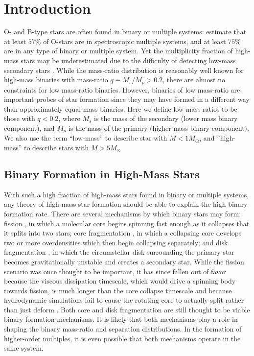 \section{Introduction}
O- and B-type stars are often found in binary or
multiple systems: \cite{Mason2009} estimate that at least $57\%$ of O-stars are
in spectroscopic multiple systems, and at least $75\%$ are in any type of binary or multiple system.
Yet the multiplicity fraction of high-mass stars may be underestimated due to the difficulty of detecting low-mass secondary stars \citep{Sana2011}.  While the mass-ratio distribution
is reasonably well known for high-mass binaries with mass-ratio $q \equiv M_s/M_p > 0.2$, there are almost no
constraints for low mass-ratio binaries. However, binaries of low mass-ratio are important probes of star formation since they may have
formed in a different way than approximately equal-mass binaries. Here we define low mass-ratios to be 
those with $q < 0.2$, where $M_s$ is the mass of the secondary (lower mass binary component), and $M_p$ 
is the mass of the primary (higher mass binary component). We also use the term ``low-mass'' to 
describe star with $M < 1 M_{\odot}$, and ''high-mass'' to describe stars with $M > 5 
M_{\odot}$


\subsection{Binary Formation in High-Mass Stars}
\label{paper1_sec:formation}
With such a high fraction of high-mass stars found in binary or multiple
systems, any theory of high-mass star formation should be able to
explain the high binary formation rate. There are several mechanisms by
which binary stars may form: fission \citep{Lyttleton1953,
  Lebovitz1974, Lebovitz1984}, in which a molecular core begins
spinning fast enough as it collapses that it splits into two stars;
core fragmentation \citep[see e.g.][]{Boss1979, Boss1986, Bate1995}, in which a collapsing core develops two or more
overdensities which then begin collapsing separately; and disk
fragmentation \citep[see e.g.][]{Kratter2006, Stamatellos2011}, in which the circumstellar disk surrounding the primary
star becomes gravitationally unstable and creates a secondary
star. While the fission scenario was once thought to be important, it
has since fallen out of favor because the viscous dissipation timescale, which would drive a spinning body towards fission, is much longer than the core collapse timescale \citep{Tohline2002} and because hydrodynamic simulations fail to cause
the rotating core to actually split rather than just deform
\citep{Tohline2001}. Both core and disk fragmentation are still
thought to be viable binary formation mechanisms. It is likely that
both mechanisms play a role in shaping the binary mass-ratio and
separation distributions. In the formation of higher-order multiples, it is even possible that both mechanisms operate in the same system.


